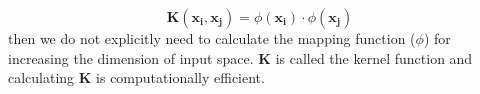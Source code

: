 \documentclass[11pt]{article}
\begin{document}
\[
\mathbf{K(x_i,x_j)} = \phi(\mathbf{x_i})\cdot \phi(\mathbf{x_j})
\]
then we do not explicitly need to calculate the mapping function ($\phi$) for increasing the dimension of input space. $\mathbf{K}$ is called the kernel function and calculating $\mathbf{K}$ is computationally efficient.
\newpage
{


}


\end{document}
